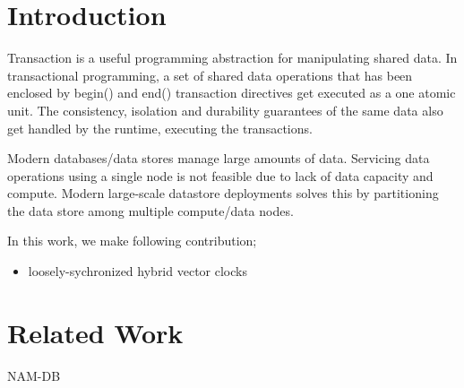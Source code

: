 \section{Introduction}
Transaction is a useful programming abstraction for manipulating 
shared data. In transactional programming,  a set of  shared data 
operations that has been enclosed by begin() and end() transaction 
directives get executed as a one atomic unit. The consistency, 
isolation and durability guarantees of the same data also 
get handled by the runtime, executing the transactions. 

Modern databases/data stores manage large amounts of data. 
Servicing data operations using a single node is not feasible 
due to lack of data capacity and compute. Modern large-scale 
datastore deployments solves this by partitioning the 
data store among multiple compute/data nodes. 




In this work, we make following contribution;
\begin{itemize}
	\item{loosely-sychronized hybrid vector clocks}
\end{itemize}




\section{Related Work}
NAM-DB~\cite{namdb}





